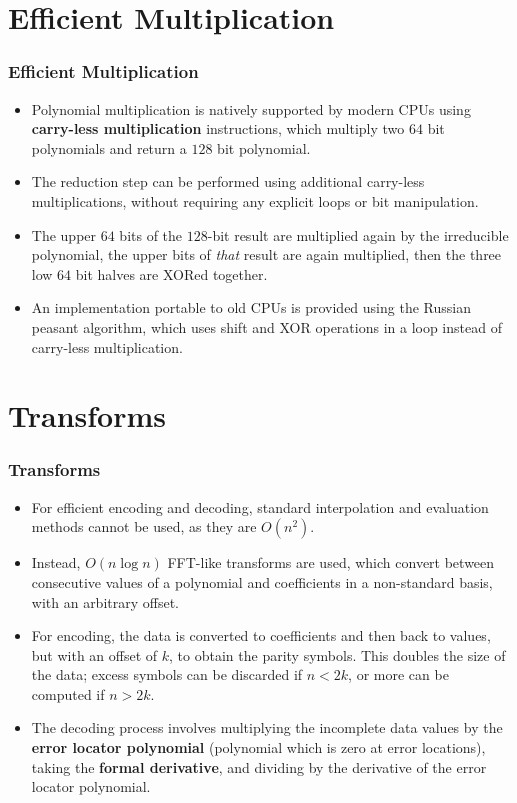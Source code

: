 \documentclass{beamer}
\begin{document}
\section{Efficient Multiplication}
\begin{frame}
\frametitle{Efficient Multiplication}
\begin{itemize}

\item
Polynomial multiplication is natively supported by modern CPUs using \textbf{carry-less multiplication} instructions, which multiply two $64$ bit polynomials and return a $128$ bit polynomial.

\item
The reduction step can be performed using additional carry-less multiplications, without requiring any explicit loops or bit manipulation.

\item
The upper $64$ bits of the $128$-bit result are multiplied again by the irreducible polynomial, the upper bits of \textit{that} result are again multiplied, then the three low $64$ bit halves are XORed together.

\item
An implementation portable to old CPUs is provided using the Russian peasant algorithm, which uses shift and XOR operations in a loop instead of carry-less multiplication.

\end{itemize}

\end{frame}

\section{Transforms}
\begin{frame}
\frametitle{Transforms}
\begin{itemize}

\item
For efficient encoding and decoding, standard interpolation and evaluation methods cannot be used, as they are $O(n^2)$.

\item
Instead, $O(n \log n)$ FFT-like transforms are used, which convert between consecutive values of a polynomial and coefficients in a non-standard basis, with an arbitrary offset.

\item
For encoding, the data is converted to coefficients and then back to values, but with an offset of $k$, to obtain the parity symbols.
This doubles the size of the data; excess symbols can be discarded if $n < 2k$, or more can be computed if $n > 2k$.

\item
The decoding process involves multiplying the incomplete data values by the \textbf{error locator polynomial} (polynomial which is zero at error locations), taking the \textbf{formal derivative}, and dividing by the derivative of the error locator polynomial.

\end{itemize}
\end{frame}
\end{document}
